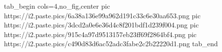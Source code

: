  
 
 
 
 


\ifcmt
  tab_begin cols=4,no_fig,center
     pic https://i2.paste.pics/6a38a136e99a962d191c33c6e30aa653.png
		 pic https://i2.paste.pics/3dcd2a0e6e36d4c8f201bdf1d239f004.png
		 pic https://i2.paste.pics/915c4a97d9513157eb23ff69f2864bf4.png
		 pic https://i2.paste.pics/c490d83d6ac52adc3fabe2c2b22220d1.png
  tab_end
\fi

